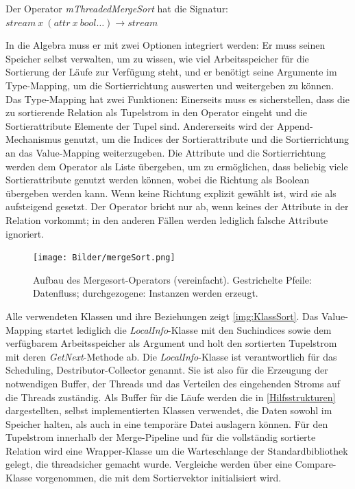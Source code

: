 \documentclass[a4paper,12pt,twoside]{article}
\newcommand{\Fb}[1]{\textit{#1}} %
\begin{document}
Der Operator \Fb{mThreadedMergeSort} hat die Signatur: \newline
$stream~x~(attr~x~bool \ldots) \longrightarrow stream$
 
In die Algebra muss er mit zwei Optionen integriert werden: Er muss seinen Speicher selbst verwalten, um zu wissen, wie viel Arbeitsspeicher für die Sortierung der Läufe zur Verfügung steht, und er benötigt seine Argumente im Type-Mapping, um die Sortierrichtung auswerten und weitergeben zu können. Das Type-Mapping hat zwei Funktionen: Einerseits muss es sicherstellen, dass die zu sortierende Relation als Tupelstrom in den Operator eingeht und die Sortierattribute Elemente der Tupel sind. Andererseits wird der Append-Mechanismus genutzt, um die Indices der Sortierattribute und die Sortierrichtung an das Value-Mapping weiterzugeben. Die Attribute und die Sortierrichtung werden dem Operator als Liste übergeben, um zu ermöglichen, dass beliebig viele Sortierattribute genutzt werden können, wobei die Richtung als Boolean übergeben werden kann. Wenn keine Richtung explizit gewählt ist, wird sie als aufsteigend gesetzt. Der Operator bricht nur ab, wenn keines der Attribute in der Relation vorkommt; in den anderen Fällen werden lediglich falsche Attribute ignoriert. 

\begin{figure}
	\centering
	\texttt{[image: Bilder/mergeSort.png]}
	\caption{Aufbau des Mergesort-Operators (vereinfacht). Gestrichelte Pfeile: Datenfluss; durchgezogene: Instanzen werden erzeugt.}
	\label{img:KlassSort}
\end{figure}

Alle verwendeten Klassen und ihre Beziehungen zeigt \autoref{img:KlassSort}. Das Value-Mapping startet lediglich die \Fb{LocalInfo}-Klasse mit den Suchindices sowie dem verfügbarem Arbeitsspeicher als Argument und holt den sortierten Tupelstrom mit deren \Fb{GetNext}-Methode ab. Die \Fb{LocalInfo}-Klasse ist verantwortlich für das Scheduling, Destributor-Collector genannt. Sie ist also für die Erzeugung der notwendigen Buffer, der Threads und das Verteilen des eingehenden Stroms auf die Threads zuständig. Als Buffer für die Läufe werden die in \autoref{Hilfsstrukturen} dargestellten, selbst implementierten Klassen verwendet, die Daten sowohl im Speicher halten, als auch in eine temporäre Datei auslagern können. Für den Tupelstrom innerhalb der Merge-Pipeline und für die vollständig sortierte Relation wird eine Wrapper-Klasse um die Warteschlange der Standardbibliothek gelegt, die threadsicher gemacht wurde. Vergleiche werden über eine Compare-Klasse vorgenommen, die mit dem Sortiervektor initialisiert wird.
\end{document}
